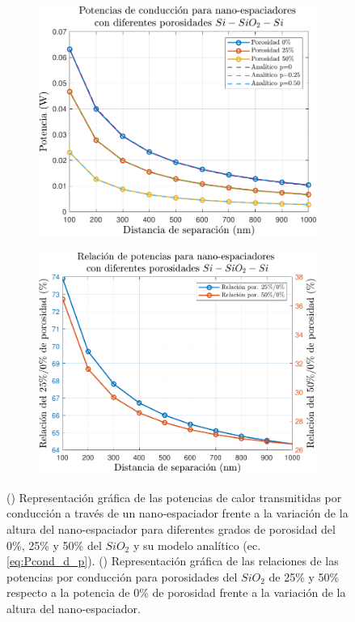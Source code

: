 \begin{figure}[H]
\centering
	\begin{subfigure}[b]{0.49\textwidth}
		\centering
		\includegraphics[width=1.0\textwidth]{figuras/Resultados/conduccion/pdf/Ppor_SiSiO2Si.pdf}
		\caption{ }
		\label{fig:Ppor_SiSiO2Si}
	\end{subfigure}
	\hfill
	\begin{subfigure}[b]{0.49\textwidth}
		\centering
		\includegraphics[width=1.0\textwidth]{figuras/Resultados/conduccion/pdf/relPpor_SiSiO2Si.pdf}
		\caption{ }
		\label{fig:relPpor_SiSiO2Si}
	\end{subfigure}
	\caption[Efectos de la porosidad del nano-espaciador sobre el flujo de calor por conducción]{() Representación gráfica de las potencias de calor transmitidas por conducción  a través de un nano-espaciador frente a la variación de la altura del nano-espaciador para diferentes grados de porosidad del 0\%, 25\% y 50\% del $SiO_2$ y su modelo analítico (ec. \eqref{eq:Pcond_d_p}). () Representación gráfica de las relaciones de las potencias por conducción para porosidades del $SiO_2$ de 25\% y 50\% respecto a la potencia de 0\% de porosidad frente a la variación de la altura del nano-espaciador.}
	\label{fig:PcondPor_SiSiO2Si}
\end{figure}
